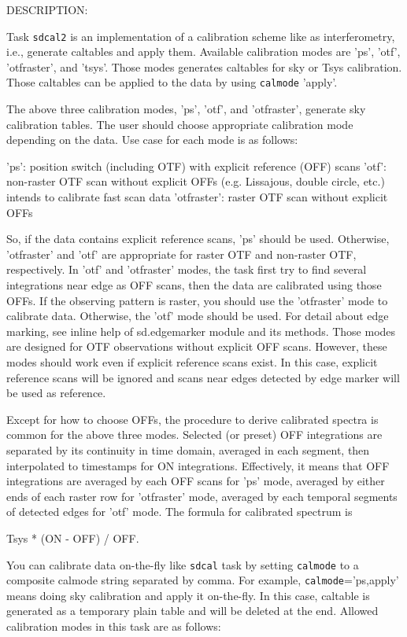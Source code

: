 DESCRIPTION:

Task {\tt sdcal2} is an implementation of a calibration scheme like as 
interferometry, i.e., generate caltables and apply them. Available 
calibration modes are 'ps', 'otf', 'otfraster', and 'tsys'. Those 
modes generates caltables for sky or Tsys calibration. Those 
caltables can be applied to the data by using {\tt calmode} 'apply'.

The above three calibration modes, 'ps', 'otf', and 'otfraster',
generate sky calibration tables. The user should choose
appropriate calibration mode depending on the data. Use case
for each mode is as follows:

    'ps': position switch (including OTF) with explicit
          reference (OFF) scans
    'otf': non-raster OTF scan without explicit OFFs
           (e.g. Lissajous, double circle, etc.)
           intends to calibrate fast scan data
    'otfraster': raster OTF scan without explicit OFFs

So, if the data contains explicit reference scans, 'ps' should
be used. Otherwise, 'otfraster' and 'otf' are appropriate for
raster OTF and non-raster OTF, respectively. In 'otf' and
'otfraster' modes, the task first try to find several integrations 
near edge as OFF scans, then the data are calibrated using those 
OFFs. If the observing pattern is raster, you 
should use the 'otfraster' mode to calibrate data. Otherwise, the 
'otf' mode should be used. For detail about edge marking, see 
inline help of sd.edgemarker module and its methods.
Those modes are designed for OTF observations without 
explicit OFF scans. However, these modes should work even if
explicit reference scans exist. In this case, explicit reference
scans will be ignored and scans near edges detected by edge
marker will be used as reference.

Except for how to choose OFFs, the procedure to derive calibrated
spectra is common for the
above three modes. Selected (or preset) OFF integrations are
separated by its continuity in time domain, averaged in
each segment, then interpolated to timestamps for ON integrations.
Effectively, it means that OFF integrations are averaged by each
OFF scans for 'ps' mode, averaged by either ends of each raster
row for 'otfraster' mode, averaged by each temporal segments of
detected edges for 'otf' mode. The formula for calibrated spectrum
is

    Tsys * (ON - OFF) / OFF. 
  
You can calibrate data on-the-fly like {\tt sdcal} task by setting 
{\tt calmode} to a composite calmode string separated by comma. 
For example, {\tt calmode}='ps,apply' means doing sky calibration and 
apply it on-the-fly. In this case, caltable is generated as a 
temporary plain table and will be deleted at the end.
Allowed calibration modes in this task are as follows:
  
